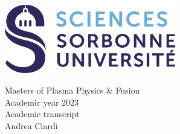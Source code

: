 \documentclass[a4paper, 11pt]{letter}
\begin{document}
\includegraphics[height=3.0cm]{su_sciences}

\begin{center}
    Masters of Plasma Physics \& Fusion \\
    Academic year 2023 \\
    Academic transcript \\

    Andrea Ciardi \\
\end{center}

\vspace{1.0cm}

\begin{flushright}
\end{flushright}

\noindent
\end{document}
